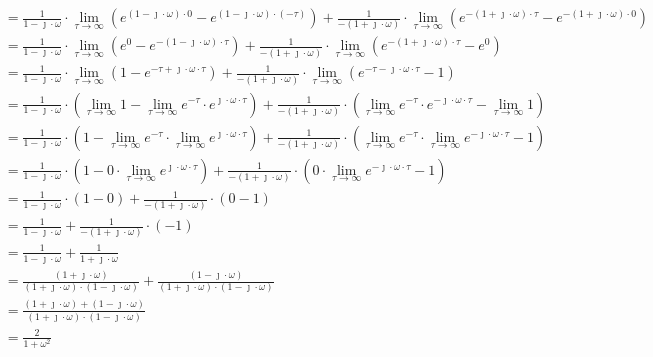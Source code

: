 \begin{task}
\begin{align*}
&=\frac{1}{1-\jmath \cdot \omega }\cdot \lim_{\tau \rightarrow \infty} \left( e^{\left(1-\jmath \cdot \omega \right)\cdot 0} - e^{\left(1-\jmath \cdot \omega \right)\cdot (-\tau)}\right) + \frac{1}{-\left(1+\jmath \cdot \omega\right)}\cdot \lim_{\tau \rightarrow \infty} \left( e^{-\left(1+\jmath \cdot \omega \right)\cdot \tau} - e^{-\left(1+\jmath \cdot \omega \right)\cdot 0}\right)\\
&=\frac{1}{1-\jmath \cdot \omega }\cdot \lim_{\tau \rightarrow \infty} \left( e^{0} - e^{-\left(1-\jmath \cdot \omega \right)\cdot \tau}\right) + \frac{1}{-\left(1+\jmath \cdot \omega\right)}\cdot \lim_{\tau \rightarrow \infty} \left( e^{-\left(1+\jmath \cdot \omega \right)\cdot \tau} - e^{0}\right)\\
&=\frac{1}{1-\jmath \cdot \omega }\cdot \lim_{\tau \rightarrow \infty} \left( 1 - e^{-\tau +\jmath \cdot \omega \cdot \tau}\right) + \frac{1}{-\left(1+\jmath \cdot \omega\right)}\cdot \lim_{\tau \rightarrow \infty} \left( e^{-\tau -\jmath \cdot \omega \cdot \tau} - 1\right)\\
&=\frac{1}{1-\jmath \cdot \omega }\cdot \left( \lim_{\tau \rightarrow \infty} 1 - \lim_{\tau \rightarrow \infty} e^{-\tau} \cdot e^{\jmath \cdot \omega \cdot \tau}\right) + \frac{1}{-\left(1+\jmath \cdot \omega\right)}\cdot \left(\lim_{\tau \rightarrow \infty} e^{-\tau}\cdot e^{-\jmath \cdot \omega \cdot \tau} - \lim_{\tau \rightarrow \infty} 1\right)\\
&=\frac{1}{1-\jmath \cdot \omega }\cdot \left( 1 - \lim_{\tau \rightarrow \infty} e^{-\tau} \cdot \lim_{\tau \rightarrow \infty} e^{\jmath \cdot \omega \cdot \tau}\right) + \frac{1}{-\left(1+\jmath \cdot \omega\right)}\cdot \left(\lim_{\tau \rightarrow \infty} e^{-\tau}\cdot \lim_{\tau \rightarrow \infty} e^{-\jmath \cdot \omega \cdot \tau} - 1\right)\\
&=\frac{1}{1-\jmath \cdot \omega }\cdot \left( 1 - 0 \cdot \lim_{\tau \rightarrow \infty} e^{\jmath \cdot \omega \cdot \tau}\right) + \frac{1}{-\left(1+\jmath \cdot \omega\right)}\cdot \left(0\cdot \lim_{\tau \rightarrow \infty} e^{-\jmath \cdot \omega \cdot \tau} - 1\right)\\
&=\frac{1}{1-\jmath \cdot \omega }\cdot \left( 1 - 0 \right) + \frac{1}{-\left(1+\jmath \cdot \omega\right)}\cdot \left(0 - 1\right)\\
&=\frac{1}{1-\jmath \cdot \omega } + \frac{1}{-\left(1+\jmath \cdot \omega\right)} \cdot (-1)\\
&=\frac{1}{1-\jmath \cdot \omega } + \frac{1}{1+\jmath \cdot \omega}\\
&=\frac{\left(1+\jmath \cdot \omega\right)}{\left(1+\jmath \cdot \omega\right) \cdot \left(1-\jmath \cdot \omega\right) } + \frac{\left(1-\jmath \cdot \omega\right)}{\left(1+\jmath \cdot \omega\right)\cdot \left(1-\jmath \cdot \omega\right)}\\
&=\frac{\left(1+\jmath \cdot \omega\right) + \left(1-\jmath \cdot \omega\right)}{\left(1+\jmath \cdot \omega\right) \cdot \left(1-\jmath \cdot \omega\right) }\\
&=\frac{2}{1+\omega^2}\\
\end{align*}


\end{task}
